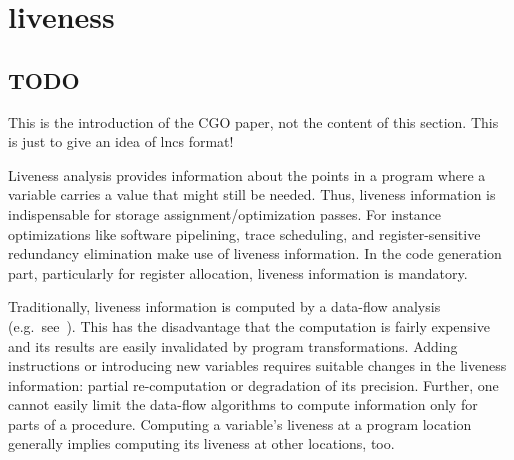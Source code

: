 \applynumberofpages\chapter{liveness }
\section{TODO}
\newcommand{\name}[1]{#1}
\newcommand{\eg}{e.g.}
\newcommand{\var}[1]{\mathtt{#1}}
\newcommand{\lao}{\name{LAO}} 
\newcommand{\firm}{\name{Firm}} 
\newcommand{\stm}{\name{STMicroelectronics}}





This is the introduction of the CGO paper, not the content of this section.
This is just to give an idea of lncs format!

Liveness analysis provides information about the points in a program where a variable carries a value that might still be needed.
Thus, liveness information is indispensable for storage assignment/optimization passes.
For instance optimizations like software pipelining, trace scheduling, and register-sensitive redundancy elimination make use of liveness information.
In the code generation part, particularly for register allocation, liveness information is mandatory.

Traditionally, liveness information is computed by a data-flow analysis (\eg\ see~\cite{cooper:2004:engineering}).
This has the disadvantage that the computation is fairly expensive and its results are easily invalidated by program transformations.
Adding instructions or introducing new variables requires suitable changes in the liveness information:
partial re-computation or degradation of its precision.
Further, one cannot easily limit the data-flow algorithms to compute information only for parts of a procedure.
Computing a variable's liveness at a program location generally implies computing its liveness at other locations, too.

